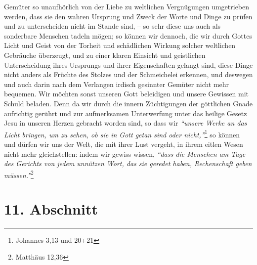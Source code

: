 Gemüter so unaufhörlich von der Liebe zu weltlichen Vergnügungen umgetrieben
werden, dass sie den wahren Ursprung und Zweck der Worte und Dinge zu prüfen und
zu unterscheiden nicht im Stande sind, -- so sehr diese uns auch als sonderbare
Menschen tadeln mögen; so können wir dennoch, die wir durch Gottes Licht und
Geist von der Torheit und schädlichen Wirkung solcher weltlichen Gebräuche
überzeugt, und zu einer klaren Einsicht und geistlichen Unterscheidung ihres
Ursprungs und ihrer Eigenschaften gelangt sind, diese Dinge nicht anders als
Früchte des Stolzes und der Schmeichelei erkennen, und deswegen und auch darin
nach dem Verlangen irdisch gesinnter Gemüter nicht mehr bequemen. Wir möchten
sonst unseren Gott beleidigen und unsere Gewissen mit Schuld beladen. Denn da
wir
durch die innern Züchtigungen der göttlichen Gnade
aufrichtig gerührt und zur
aufmerksamen Unterwerfung unter das heilige Gesetz Jesu in unseren
Herzen
gebracht worden sind, so dass wir
\textit{"`unsere Werke an das Licht bringen, um zu
sehen, ob sie in Gott getan sind oder nicht,"'}\footnote{Johannes 3,13 und
20+21}
so können und dürfen wir uns der Welt, die mit ihrer Lust vergeht, in ihrem
eitlen
Wesen nicht mehr gleichstellen: indem wir gewiss wissen,
\textit{"`dass die Menschen am
Tage des Gerichts von jedem unnützen Wort, das sie geredet haben, Rechenschaft
geben müssen."'}\footnote{Matthäus 12,36}

\section{11. Abschnitt} \label{kap10_ab11}

